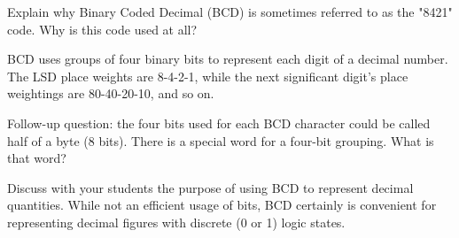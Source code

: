 

Explain why Binary Coded Decimal (BCD) is sometimes referred to as the "8421" code.  Why is this code used at all?







BCD uses groups of four binary bits to represent each digit of a decimal number.  The LSD place weights are 8-4-2-1, while the next significant digit's place weightings are 80-40-20-10, and so on.

\vskip 10pt

Follow-up question: the four bits used for each BCD character could be called half of a byte (8 bits).  There is a special word for a four-bit grouping.  What is that word?







Discuss with your students the purpose of using BCD to represent decimal quantities.  While not an efficient usage of bits, BCD certainly is convenient for representing decimal figures with discrete (0 or 1) logic states.




